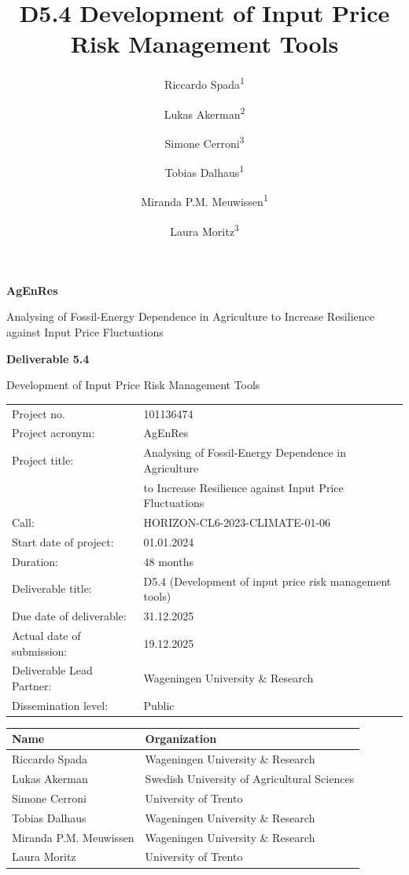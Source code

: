 \documentclass[12pt,a4paper]{article}
\title{\textbf{D5.4 Development of Input Price Risk Management Tools}}
\author{
    Riccardo Spada\textsuperscript{1} \and
    Lukas Akerman\textsuperscript{2} \and
    Simone Cerroni\textsuperscript{3} \and
    Tobias Dalhaus\textsuperscript{1} \and
    Miranda P.M. Meuwissen\textsuperscript{1} \and
    Laura Moritz\textsuperscript{3}
}
\date{}
\begin{document}

\begin{titlepage}
\centering
\vspace*{2cm}

{\LARGE \textbf{AgEnRes} \par}
\vspace{0.5cm}
{\large Analysing of Fossil-Energy Dependence in Agriculture to Increase Resilience against Input Price Fluctuations \par}

\vspace{2cm}

{\Huge \textbf{Deliverable 5.4} \par}
\vspace{0.5cm}
{\Large Development of Input Price Risk Management Tools \par}

\vspace{2cm}

\begin{tabular}{ll}
\toprule
Project no. & 101136474 \\
Project acronym: & AgEnRes \\
Project title: & Analysing of Fossil-Energy Dependence in Agriculture \\
 & to Increase Resilience against Input Price Fluctuations \\
Call: & HORIZON-CL6-2023-CLIMATE-01-06 \\
Start date of project: & 01.01.2024 \\
Duration: & 48 months \\
Deliverable title: & D5.4 (Development of input price risk management tools) \\
Due date of deliverable: & 31.12.2025 \\
Actual date of submission: & 19.12.2025 \\
Deliverable Lead Partner: & Wageningen University \& Research \\
Dissemination level: & Public \\
\bottomrule
\end{tabular}

\vspace{1.5cm}

\begin{tabular}{ll}
\toprule
\textbf{Name} & \textbf{Organization} \\
\midrule
Riccardo Spada & Wageningen University \& Research \\
Lukas Akerman & Swedish University of Agricultural Sciences \\
Simone Cerroni & University of Trento \\
Tobias Dalhaus & Wageningen University \& Research \\
Miranda P.M. Meuwissen & Wageningen University \& Research \\
Laura Moritz & University of Trento \\
\bottomrule
\end{tabular}

\vfill
\end{titlepage}
\end{document}

